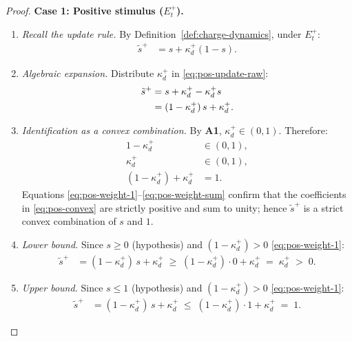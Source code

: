 \documentclass[12pt,openany]{book}
\numberwithin{equation}{chapter}
\theoremstyle{plain}
\theoremstyle{definition}
\theoremstyle{remark}
\begin{document}
\begin{proof}
\medskip
\noindent\textbf{Case 1: Positive stimulus ($E_t^{+}$).}
\begin{enumerate}
  \item \emph{Recall the update rule.}
    By Definition~\ref{def:charge-dynamics}, under $E_t^{+}$:
    \begin{align}
      \tilde{s}^{+} &= s + \kappa_d^{+}(1 - s).
      \label{eq:pos-update-raw}
    \end{align}
  \item \emph{Algebraic expansion.}
    Distribute $\kappa_d^{+}$ in \eqref{eq:pos-update-raw}:
    \begin{align}
      \tilde{s}^{+}
        &= s + \kappa_d^{+} - \kappa_d^{+} s \notag\\
        &= (1 - \kappa_d^{+})\,s + \kappa_d^{+}.
      \label{eq:pos-convex}
    \end{align}
  \item \emph{Identification as a convex combination.}
    By \textbf{A1}, $\kappa_d^{+} \in (0,1)$.  Therefore:
    \begin{align}
      1 - \kappa_d^{+} &\in (0,1),
      \label{eq:pos-weight-1}\\
      \kappa_d^{+}     &\in (0,1),
      \label{eq:pos-weight-2}\\
      (1-\kappa_d^{+}) + \kappa_d^{+} &= 1.
      \label{eq:pos-weight-sum}
    \end{align}
    Equations \eqref{eq:pos-weight-1}--\eqref{eq:pos-weight-sum}
    confirm that the coefficients in \eqref{eq:pos-convex} are
    strictly positive and sum to unity; hence $\tilde{s}^{+}$ is a
    strict convex combination of $s$ and $1$.
  \item \emph{Lower bound.}
    Since $s \geq 0$ (hypothesis) and
    $(1-\kappa_d^{+}) > 0$ \eqref{eq:pos-weight-1}:
    \begin{align}
      \tilde{s}^{+}
        &= (1-\kappa_d^{+})\,s + \kappa_d^{+}
         \;\geq\; (1-\kappa_d^{+})\cdot 0 + \kappa_d^{+}
         \;=\; \kappa_d^{+}
         \;>\; 0.
      \label{eq:pos-lower}
    \end{align}
  \item \emph{Upper bound.}
    Since $s \leq 1$ (hypothesis) and
    $(1-\kappa_d^{+}) > 0$ \eqref{eq:pos-weight-1}:
    \begin{align}
      \tilde{s}^{+}
        &= (1-\kappa_d^{+})\,s + \kappa_d^{+}
         \;\leq\; (1-\kappa_d^{+})\cdot 1 + \kappa_d^{+}
         \;=\; 1.
      \label{eq:pos-upper}

\end{align}
\end{enumerate}
\end{proof}
\end{document}
